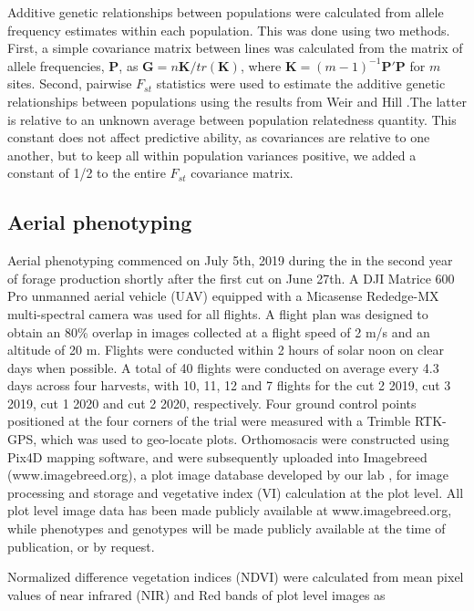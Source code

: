 \documentclass[12pt, letterpaper]{article}
\begin{document}
Additive genetic relationships between populations were calculated from allele frequency estimates within each population. This was done using two methods. First, a simple covariance matrix between lines was calculated from the matrix of allele frequencies, $\mathbf{P}$, as $\mathbf{G} = n\mathbf{K} / tr(\mathbf{K})$, where $\mathbf{K} = (m-1)^{-1}\mathbf{P}'\mathbf{P}$ for $m$ sites. Second, pairwise $F_{st}$ statistics were used to estimate the additive genetic relationships between populations using the results from Weir and Hill \parencite*[equation 7;][]{weir2002}.The latter is relative to an unknown average between population relatedness quantity. This constant does not affect predictive ability, as covariances are relative to one another, but to keep all within population variances positive, we added a constant of 1/2 to the entire $F_{st}$ covariance matrix.

\subsection{Aerial phenotyping}

Aerial phenotyping commenced on July 5th, 2019 during the in the second year of forage production shortly after the first cut on June 27th. A DJI Matrice 600 Pro unmanned aerial vehicle (UAV) equipped with a Micasense Rededge-MX multi-spectral camera was used for all flights. A flight plan was designed to obtain an 80\% overlap in images collected at a flight speed of 2 m/s and an altitude of 20 m. Flights were conducted within 2 hours of solar noon on clear days when possible. A total of 40 flights were conducted on average every 4.3 days across four harvests, with 10, 11, 12 and 7 flights for the cut 2 2019, cut 3 2019, cut 1 2020 and cut 2 2020, respectively. Four ground control points positioned at the four corners of the trial were measured with a Trimble RTK-GPS, which was used to geo-locate plots. Orthomosacis were constructed using Pix4D mapping software, and were subsequently uploaded into Imagebreed (www.imagebreed.org), a plot image database developed by our lab \parencite{morales2020}, for image processing and storage and vegetative index (VI) calculation at the plot level. All plot level image data has been made publicly available at www.imagebreed.org, while phenotypes and genotypes will be made publicly available at the time of publication, or by request.


Normalized difference vegetation indices (NDVI) were calculated from mean pixel values of near infrared (NIR) and Red bands of plot level images as
\end{document}
